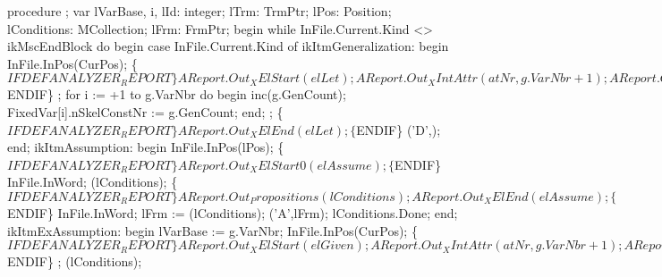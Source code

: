 \nwenddocs{}\endmoddef\nwstartdeflinemarkup{}\nwenddeflinemarkup
procedure ;
var
   lVarBase, i, lId: integer;
   lTrm: TrmPtr;
   lPos: Position;
   lConditions: MCollection;
   lFrm: FrmPtr;
begin
   while InFile.Current.Kind <> ikMscEndBlock do
   begin
      case InFile.Current.Kind of
         ikItmGeneralization:
            begin
               InFile.InPos(CurPos);
               \{$IFDEF ANALYZER_REPORT\}
               AReport.Out_XElStart(elLet);
               AReport.Out_XIntAttr(atNr, g.VarNbr+1);
               AReport.Out_XAttrEnd;
               \{$ENDIF\}
               ;
               for i := +1 to g.VarNbr do
               begin
                  inc(g.GenCount);
                  FixedVar[i].nSkelConstNr := g.GenCount;
               end;
               ;
               \{$IFDEF ANALYZER_REPORT\}
               AReport.Out_XElEnd(elLet);
               \{$ENDIF\}
               ('D',);
            end;
         ikItmAssumption:
            begin
               InFile.InPos(lPos);
               \{$IFDEF ANALYZER_REPORT\}
               AReport.Out_XElStart0(elAssume);
               \{$ENDIF\}
               InFile.InWord; (lConditions);
               \{$IFDEF ANALYZER_REPORT\}
               AReport.Out_Propositions(lConditions);
               AReport.Out_XElEnd(elAssume);
               \{$ENDIF\}
               InFile.InWord;
               lFrm := (lConditions);
               ('A',lFrm);
               lConditions.Done;
            end;
         ikItmExAssumption:
            begin
               lVarBase := g.VarNbr;
               InFile.InPos(CurPos);
               \{$IFDEF ANALYZER_REPORT\}
               AReport.Out_XElStart(elGiven);
               AReport.Out_XIntAttr(atNr, g.VarNbr+1);
               AReport.Out_XAttrEnd;
               \{$ENDIF\}
               ;
               (lConditions);
